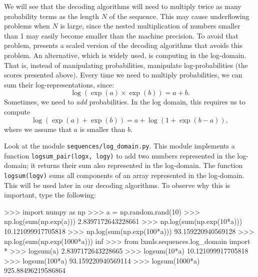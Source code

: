We will see that the decoding algorithms 
will need to multiply twice as many probability terms as 
the length $N$ of the sequence. 
This may cause underflowing problems 
when $N$ is large, since the nested multiplication of numbers smaller than 1
may easily become smaller than the machine precision. To avoid that
problem, \cite{rabiner} presents a scaled version of the decoding algorithms that avoids this problem.
An alternative, which is widely used, is computing
in the log-domain. That is, instead of 
manipulating probabilities, manipulate log-probabilities (the scores presented above). 
Every time we need to multiply probabilities, 
we can sum their log-representations, since:
\begin{equation}
\log(\exp(a) \times \exp(b)) = a+b.
\end{equation}
Sometimes, we need to \emph{add} probabilities. 
In the log domain, this requires us to compute 
\begin{equation}
\log(\exp(a) + \exp(b)) = a + \log(1 + \exp(b-a)),
\end{equation}
where we assume that $a$ is smaller than $b$.


\begin{exercise}
Look at the module {\tt sequences/log\_domain.py}. 
This module implements a function
{\tt logsum\_pair(logx, logy)} to 
add two numbers represented in the log-domain;
it returns their sum also represented in the log-domain. The function {\tt logsum(logv)} 
sums all components of an array 
represented in the log-domain. 
This will be used later in our decoding algorithms.
To observe why this is important, type the 
following:
\begin{python}
>>> import numpy as np
>>> a = np.random.rand(10)
>>> np.log(sum(np.exp(a)))
2.8397172643228661
>>> np.log(sum(np.exp(10*a)))
10.121099917705818
>>> np.log(sum(np.exp(100*a)))
93.159220940569128
>>> np.log(sum(np.exp(1000*a)))
inf
>>> from lxmls.sequences.log_domain import *
>>> logsum(a)
2.8397172643228665
>>> logsum(10*a)
10.121099917705818
>>> logsum(100*a)
93.159220940569114
>>> logsum(1000*a)
925.88496219586864
\end{python}
\end{exercise}


